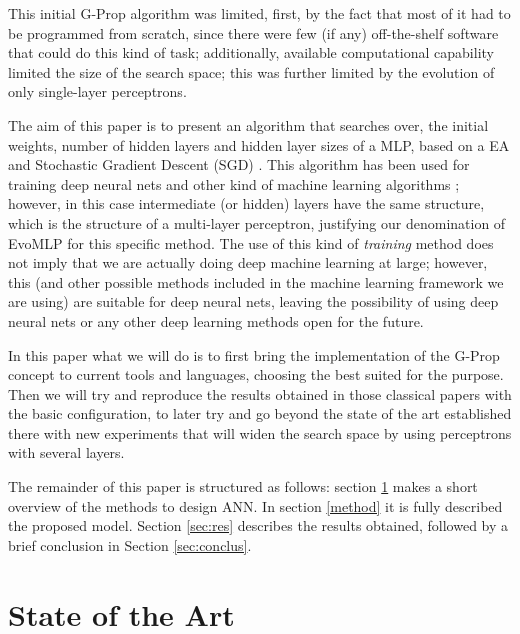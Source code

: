 \documentclass[conference]{IEEEtran}\usepackage[]{graphicx}\usepackage[]{color}
\begin{document}
This initial G-Prop algorithm was limited, first, by the fact that
most of it had to be programmed from scratch, since there were few (if
any) off-the-shelf software that could do this kind of task;
additionally, available computational capability limited the size of
the search space; this was further limited by the evolution of only single-layer perceptrons.

The aim of this paper is to present an algorithm that searches over, the initial weights, number of
hidden layers and hidden layer sizes of a MLP, based on a EA and
Stochastic Gradient Descent (SGD) \cite{bottou2012stochastic}. This
algorithm has been used for training deep neural nets and other kind
of machine learning algorithms
\cite{bottou2012stochastic,bottou2010large}; however, in this case
intermediate (or hidden) layers have the same structure,
which is the structure of a multi-layer perceptron, justifying our
denomination of {\sf EvoMLP} for this specific method.
The use of this kind of {\em training} method does not imply that we
are actually doing deep machine learning at large; however, this (and
other possible methods included in the machine learning framework we
are using) are suitable for deep neural nets,
leaving the possibility of using deep neural nets or any other
deep learning methods open for the future.

In this paper what we will do is to first bring the implementation of
the G-Prop concept to current tools and languages, choosing the best
suited for the purpose. Then we will try and reproduce the results
obtained in those classical papers with the basic configuration, to
later try and go beyond the state of the art established there with
new experiments that will widen the search space by using perceptrons
with several layers.

The remainder of this paper is structured as follows:
section \ref{soa} makes a short overview of the methods to design ANN.
In section \ref{method} it is fully described the proposed model.
Section \ref{sec:res} describes the results obtained,
followed by a brief conclusion in Section \ref{sec:conclus}.

\section{State of the Art}
\label{soa}
\end{document}
